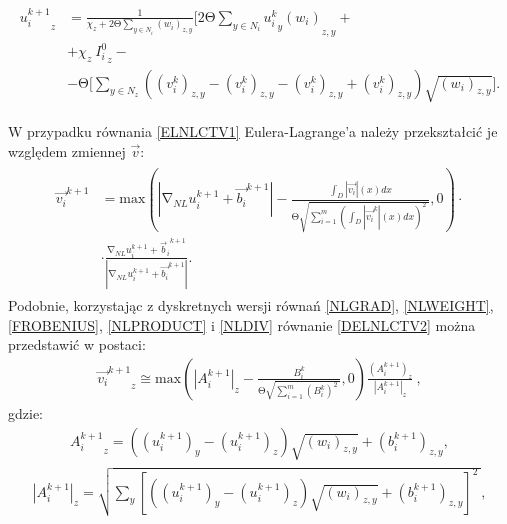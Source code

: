 \documentclass[a4paper,12pt,twoside,openany]{report}
\begin{document}
\begin{large}
\begin{align}
\begin{aligned}
{u^{k+1}_i}_{z} &= \frac{1}{\chi_z+2\mathrm{\Theta} \sum\limits_{y\in N_i} \left({w_i}\right)_{z,y}} \Biggl[2\mathrm{\Theta }\sum_{y\in N_i} {{{u^k_i}_y \left({w_i}\right)}_{z,y}}+\\
&+ \chi_z \ {I^0_i}_z -\\
&-\mathrm{\Theta} \Biggl[\sum_{y\in N_z} \left({ \left( v^k_i \right)}_{z,y} - { \left( v^k_i \right)}_{z,y} - { \left( v^k_i \right)}_{z,y} + { \left( v^k_i \right)}_{z,y}\right) \sqrt{{\left(w_i\right)}_{z,y}} \Biggr].
\end{aligned}
\label{uNLCTV}
\end{align}
\end{large}
W przypadku równania \eqref{ELNLCTV1} Eulera-Lagrange’a należy przekształcić je względem zmiennej $\overrightarrow{v}$:
\begin{align}
\begin{aligned}
{\overrightarrow{v_i}}^{k+1} &= \mathrm{max} \left(\left|{\mathrm{\nabla }}_{NL}u^{k+1}_i+{\overrightarrow{b_i}}^{k+1}\right|-\frac{\int_D{\left|\overrightarrow{v_i}\right|(x)}dx}{\mathrm{\Theta }\sqrt{\sum^m_{i=1}{{\left(\int_D{\left|{\overrightarrow{v_i}}^k\right|(x)}dx\right)}^2}\ }},0\right) \cdot\\ 
&\cdot \frac{{\mathrm{\nabla }}_{NL}u^{k+1}_i+{{\overrightarrow{b}}_i}^{k+1}}{\left|{\mathrm{\nabla }}_{NL}u^{k+1}_i+{\overrightarrow{b_i}}^{k+1}\right|}.
\label{DELNLCTV2}
\end{aligned}
\end{align}
Podobnie, korzystając z dyskretnych wersji równań \eqref{NLGRAD}, \eqref{NLWEIGHT}, \eqref{FROBENIUS}, \eqref{NLPRODUCT} i \eqref{NLDIV} równanie \eqref{DELNLCTV2} można przedstawić w postaci:
\begin{align}
{{\overrightarrow{v_i}}^{k+1}}_z \cong {\mathrm{max} \left({\left|A^{k+1}_i\right|}_z-\frac{B^k_i}{\mathrm{\Theta }\sqrt{\sum^m_{i=1}{{\left(B^k_i\right)}^2}\ }},0\right)\frac{\left(A^{k+1}_i\right)_z}{{\left|A^{k+1}_i\right|}_z}\ },
\label{VNLCTVITER}
\end{align}
gdzie:
\begin{align}
{A^{k+1}_i}_z=\left({\left(u^{k+1}_i\right)}_y-{\left(u^{k+1}_i\right)}_z\right)\sqrt{{\left(w_{i}\right)}_{z,y}}+{\left(b^{k+1}_i\right)}_{z,y},
\end{align} 
\begin{align}
{\left|A^{k+1}_i\right|}_z=\sqrt{\sum_y{{\left[\left(\left(u^{k+1}_i\right)_y-\left(u^{k+1}_i\right)_z\right)\sqrt{\left(w_i\right)_{z,y}}+\left(b^{k+1}_i\right)_{z,y}\right]}^2}\ },
\end{align}
\end{document}
